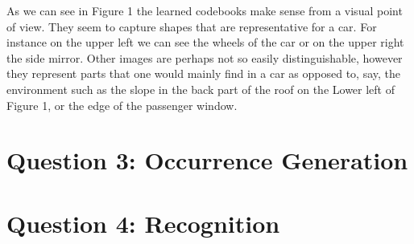 \documentclass[12pt]{article}
\begin{document}
As we can see in Figure 1 the learned codebooks make sense from a visual point of view. They seem to capture shapes that are representative for a car. For instance on the upper left we can see the wheels of the car or on the upper right the side mirror. Other images are perhaps not so easily distinguishable, however they represent parts that one would mainly find in a car as opposed to, say, the environment such as the slope in the back part of the roof on the Lower left of Figure 1, or the edge of the passenger window.
\newpage
\section*{Question 3: Occurrence Generation}

\newpage
\section*{Question 4: Recognition}
\end{document}
